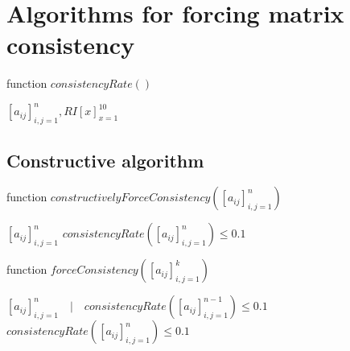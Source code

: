 \documentclass[authoryear,manuscript,12pt]{elsarticle}
\begin{document}
\section{Algorithms for forcing matrix consistency}
\begin{algorithm}
\caption{function $consistencyRate()$}\label{alg:CA}
\begin{algorithmic}
\Require $[a_{ij}]_{i,j=1}^{n}, RI[x]_{x=1}^{10}$
\end{algorithmic}
\end{algorithm}

\subsection{Constructive algorithm}

\begin{algorithm}
\caption{function $constructivelyForceConsistency([a_{ij}]_{i,j=1}^{n})$}\label{alg:CA}
\begin{algorithmic}
\Require $[a_{ij}]_{i,j=1}^{n}$
\Ensure $consistencyRate([a_{ij}]_{i,j=1}^{n}) \leq 0.1$
\Else
		\EndIf
	\EndFor
\EndIf
{}

\end{algorithmic}
\end{algorithm}

\begin{algorithm}
\caption{function $forceConsistency([a_{ij}]_{i,j=1}^{k})$}\label{alg:CA}
\begin{algorithmic}
\Require $[a_{ij}]_{i,j=1}^{n} \quad | \quad consistencyRate([a_{ij}]_{i,j=1}^{n-1}) \leq 0.1 $
\Ensure $consistencyRate([a_{ij}]_{i,j=1}^{n}) \leq 0.1$
		\EndIf
			\EndIf
		\EndIf
		\EndIf
	\EndFor
	\EndIf
\EndFor
{}
\end{algorithmic}
\end{algorithm}
\end{document}
